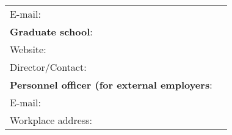\begin{tabular}{p{8.5cm}p{6.5cm}}
\hspace{.7cm} E-mail:                     &\cellcolor[gray]{0.95}                         \\
\textbf{Graduate school}:                 &\cellcolor[gray]{0.95}\bf                      \\
\hspace{.7cm} Website:                    &\cellcolor[gray]{0.95}                         \\
\hspace{.7cm} Director/Contact:           &\cellcolor[gray]{0.95}                         \\
%
\textbf{Personnel officer (for external employers}:& \cellcolor[gray]{0.95}\bf            \\
\hspace{.7cm} E-mail:                     &\cellcolor[gray]{0.95}                         \\
\hspace{.7cm} Workplace address:          &\cellcolor[gray]{0.95}                         \\
\end{tabular}

